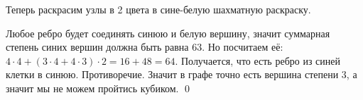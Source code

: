 Теперь раскрасим узлы в 2 цвета в сине-белую шахматную раскраску.

Любое ребро будет соединять синюю и белую вершину, значит суммарная степень синих вершин должна быть равна $\displaystyle 63$. Но посчитаем её: $\displaystyle 4\cdotp 4+( 3\cdotp 4+4\cdotp 3) \cdotp 2=16+48=64$. Получается, что есть ребро из синей клетки в синюю. Противоречие. Значит в графе точно есть вершина степени 3, а значит мы не можем пройтись кубиком. \qed 
